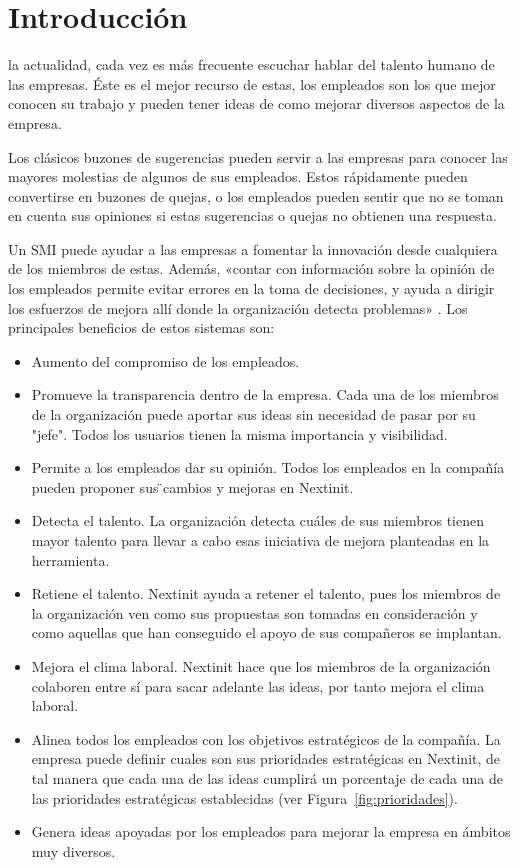 \chapter{Introducción}

 la actualidad, cada vez es más frecuente escuchar hablar del talento humano de las empresas. Éste es el mejor recurso de estas,
 los empleados son los que mejor conocen su trabajo y pueden tener ideas de como mejorar diversos aspectos de la empresa. 
 
 Los clásicos buzones de sugerencias pueden servir a las empresas para conocer las mayores molestias de
  algunos de sus empleados. Estos rápidamente pueden convertirse en buzones de quejas, o los empleados pueden
   sentir que no se toman en cuenta sus opiniones si estas  sugerencias o quejas no obtienen una respuesta.
 
 Un \acf{SMI} puede ayudar a las empresas a fomentar la innovación desde cualquiera de los miembros de 
 estas. Además, «contar con información sobre la opinión de los empleados permite evitar errores en la toma
  de decisiones, y ayuda a dirigir los esfuerzos de mejora allí donde la organización detecta problemas»
   \cite{talento}. Los principales beneficios de estos sistemas son:
 
 \begin{itemize}
 	\item Aumento del compromiso de los empleados. 
 	\item Promueve la transparencia dentro de la empresa. Cada una de los miembros de la organización
 	puede aportar sus ideas sin necesidad de pasar por 	su "jefe". Todos los usuarios tienen la misma
 	 importancia y visibilidad.
 	\item Permite a los empleados dar su opinión. Todos los empleados en la compañía pueden proponer sus  ̈cambios y mejoras en Nextinit.
 	\item Detecta el talento. La organización detecta cuáles de sus miembros tienen
 	mayor talento para llevar a cabo esas iniciativa de mejora planteadas en la herramienta.
 	\item Retiene el talento. Nextinit ayuda a retener el talento, pues los miembros de la organización
 	 ven como sus propuestas son tomadas en consideración y como aquellas que han conseguido el apoyo de
 	  sus compañeros se implantan.
 	\item Mejora el clima laboral. Nextinit hace que los miembros de la organización colaboren entre sí 
 	para sacar adelante las ideas, por tanto mejora el clima laboral.
 	\item Alinea todos los empleados con los objetivos estratégicos de la compañía. La empresa puede definir cuales son sus prioridades estratégicas en Nextinit, de tal manera que cada una de las ideas 
 	cumplirá un porcentaje de cada una de las prioridades estratégicas establecidas (ver Figura~\ref{fig:prioridades}).
 	\item Genera ideas apoyadas por los empleados para mejorar la empresa en ámbitos muy diversos.
 \end{itemize}

